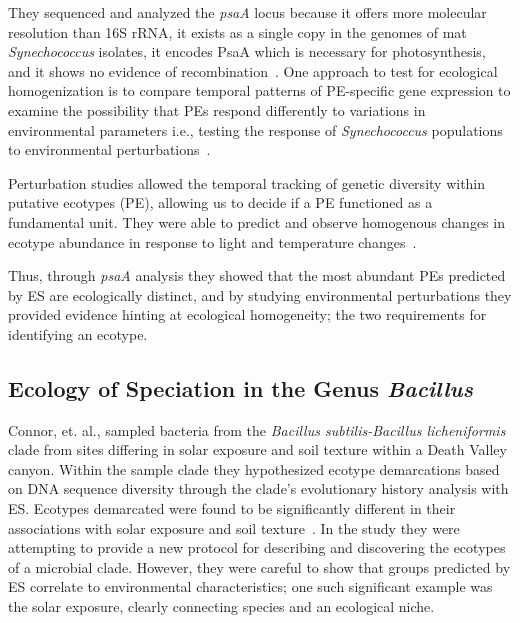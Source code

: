 They sequenced and analyzed the \emph{psaA} locus because it offers more molecular resolution than 16S rRNA, it exists as a single copy in the genomes of mat \emph{Synechococcus} isolates, it encodes PsaA which is necessary for photosynthesis, and it shows no evidence of recombination~\cite{pyroEric}.
One approach to test for ecological homogenization is to compare temporal patterns of PE-specific gene expression to examine the possibility that PEs respond differently to variations in environmental parameters i.e., testing the response of \emph{Synechococcus} populations to environmental perturbations~\cite{pyroEric}.

Perturbation studies allowed the temporal tracking of genetic diversity within putative ecotypes (PE), allowing us to decide if a PE functioned as a fundamental unit.
They were able to predict and observe homogenous changes in ecotype abundance in response to light and temperature changes~\cite{pyroEric}.

Thus, through \emph{psaA} analysis they showed that the most abundant PEs predicted by ES are ecologically distinct, and by studying environmental perturbations they provided evidence hinting at ecological homogeneity; the two requirements for identifying an ecotype.

\subsection*{Ecology of Speciation in the Genus \emph{Bacillus}}
Connor, et. al., sampled bacteria from the \emph{Bacillus subtilis-Bacillus licheniformis} clade from sites differing in solar exposure and soil texture within a Death Valley canyon.
Within the sample clade they hypothesized ecotype demarcations based on DNA sequence diversity through the clade's evolutionary history analysis with ES.
Ecotypes demarcated were found to be significantly different in their associations with solar exposure and soil texture~\cite{connor2010ecology}.
In the study they were attempting to provide a new protocol for describing and discovering the ecotypes of a microbial clade.
However, they were careful to show that groups predicted by ES correlate to environmental characteristics; one such significant example was the solar exposure, clearly connecting species and an ecological niche.

